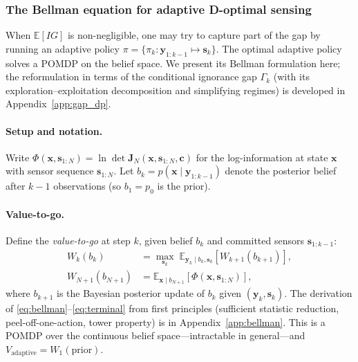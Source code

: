 \documentclass[11pt,a4paper]{article}
\newcommand{\E}{\mathbb{E}}
\begin{document}
\subsubsection{The Bellman equation for adaptive D-optimal sensing}

When $\E[IG]$ is non-negligible, one may try to capture part of the gap by running an adaptive policy $\pi = \{\pi_k : \bm{y}_{1:k-1} \mapsto \bm{s}_k\}$.  The optimal adaptive policy solves a POMDP on the belief space.  We present its Bellman formulation here; the reformulation in terms of the conditional ignorance gap $\Gamma_k$ (with its exploration--exploitation decomposition and simplifying regimes) is developed in Appendix~\ref{app:gap_dp}.

\paragraph{Setup and notation.}
Write $\Phi(\bm{x}, \bm{s}_{1:N}) = \ln\det\bm{J}_N(\bm{x}, \bm{s}_{1:N}, \bm{c})$ for the log-information at state $\bm{x}$ with sensor sequence $\bm{s}_{1:N}$.  Let $b_k = p(\bm{x} \mid \bm{y}_{1:k-1})$ denote the posterior belief after $k-1$ observations (so $b_1 = p_0$ is the prior).

\paragraph{Value-to-go.}
Define the \emph{value-to-go} at step $k$, given belief $b_k$ and committed sensors $\bm{s}_{1:k-1}$:
\begin{align}
  W_k(b_k) &= \max_{\bm{s}_k} \; \E_{\bm{y}_k \mid b_k, \bm{s}_k}\!\left[W_{k+1}(b_{k+1})\right], \label{eq:bellman} \\
  W_{N+1}(b_{N+1}) &= \E_{\bm{x} \mid b_{N+1}}\!\left[\Phi(\bm{x}, \bm{s}_{1:N})\right], \label{eq:terminal}
\end{align}
where $b_{k+1}$ is the Bayesian posterior update of $b_k$ given $(\bm{y}_k, \bm{s}_k)$.  The derivation of \eqref{eq:bellman}--\eqref{eq:terminal} from first principles (sufficient statistic reduction, peel-off-one-action, tower property) is in Appendix~\ref{app:bellman}.  This is a POMDP over the continuous belief space---intractable in general---and $V_{\text{adaptive}} = W_1(\text{prior})$.
\end{document}
